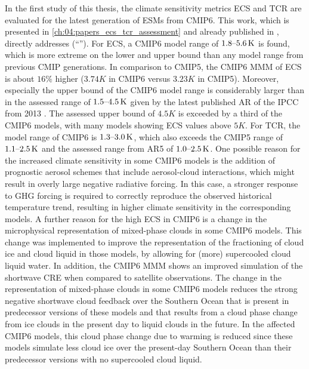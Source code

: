 In the first study of this thesis, the climate sensitivity metrics \ac{ECS} and
\ac{TCR} are evaluated for the latest generation of \acp{ESM} from \acs{CMIP}6.
This work, which is presented in \cref{ch:04:papers_ecs_tcr_assessment} and
already published in \textcite{Bock2020, Meehl2020}, directly addresses
 (\enquote{\KeyScienceQuestionOne{}}). For \ac{ECS}, a
\acs{CMIP}6 model range of $\rangeunit{1.8}{5.6}{K}$ is found, which is more
extreme on the lower and upper bound than any model range from previous
\ac{CMIP} generations. In comparison to \acs{CMIP}5, the \acs{CMIP}6 \ac{MMM}
of \ac{ECS} is about $16 \unit{\%}$ higher ($3.74 \unit{K}$ in \acs{CMIP}6
versus $3.23 \unit{K}$ in \acs{CMIP}5). Moreover, especially the upper bound of
the \acs{CMIP}6 model range is considerably larger than in the assessed range
of $\rangeunit{1.5}{4.5}{K}$ given by the latest published \ac{AR} of the
\ac{IPCC} from 2013 \autocite{Stocker2013}. The assessed upper bound of $4.5
\unit{K}$ is exceeded by a third of the \acs{CMIP}6 models, with many models
showing \ac{ECS} values above $5 \unit{K}$. For \ac{TCR}, the model range of
\acs{CMIP}6 is $\rangeunit{1.3}{3.0}{K}$, which also exceeds the \acs{CMIP}5
range of $\rangeunit{1.1}{2.5}{K}$ and the assessed range from \acs{AR}5 of
$\rangeunit{1.0}{2.5}{K}$. One possible reason for the increased climate
sensitivity in some \acs{CMIP}6 models is the addition of prognostic aerosol
schemes that include aerosol-cloud interactions, which might result in overly
large negative radiative forcing. In this case, a stronger response to \ac{GHG}
forcing is required to correctly reproduce the observed historical temperature
trend, resulting in higher climate sensitivity in the corresponding models. A
further reason for the high \ac{ECS} in \acs{CMIP}6 is a change in the
microphysical representation of mixed-phase clouds in some \acs{CMIP}6 models.
This change was implemented to improve the representation of the fractioning of
cloud ice and cloud liquid in those models, \eg{} by allowing for (more)
supercooled cloud liquid water. In addition, the \acs{CMIP}6 \ac{MMM} shows an
improved simulation of the shortwave \ac{CRE} when compared to satellite
observations. The change in the representation of mixed-phase clouds in some
\acs{CMIP}6 models reduces the strong negative shortwave cloud feedback over
the Southern Ocean that is present in predecessor versions of these models and
that results from a cloud phase change from ice clouds in the present day to
liquid clouds in the future. In the affected \acs{CMIP}6 models, this cloud
phase change due to warming is reduced since these models simulate less cloud
ice over the present-day Southern Ocean than their predecessor versions with no
supercooled cloud liquid.

